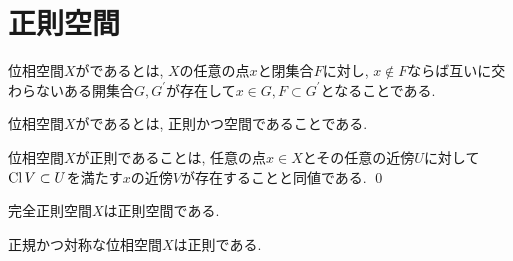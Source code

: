 \documentclass[uplatex, dvipdfmx, a4paper, 12pt, class=jsbook, crop=false]{standalone}
\begin{document}
\section{正則空間}
\label{sec:regular-spaces}

\begin{definition}
	位相空間$ X $がであるとは, $ X $の任意の点$ x $と閉集合$ F $に対し, $ x \not\in F $ならば互いに交わらないある開集合$ G, G^\prime $が存在して$ x \in G, F \subset G^\prime $となることである.
\end{definition}

\begin{definition}
	位相空間$ X $がであるとは, 正則かつ空間であることである.
\end{definition}

\begin{proposition}
	\label{prop:A property equivalent to regularity}
	位相空間$ X $が正則であることは, 任意の点$ x \in X $とその任意の近傍$ U $に対して$ \mathop{\mathrm{Cl}}\nolimits{V} \subset U $を満たす$ x $の近傍$ V $が存在することと同値である.
	\qed
\end{proposition}

\begin{proposition}
	完全正則空間$ X $は正則空間である.
\end{proposition}

\begin{proposition}
	正規かつ対称な位相空間$ X $は正則である.
\end{proposition}
\end{document}
